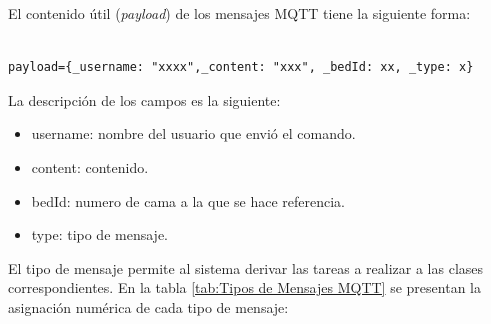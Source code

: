 El contenido útil (\textit{payload}) de los mensajes MQTT tiene la siguiente forma:

\begin{lstlisting}[label=cod:Mensaje MQTT,caption=  Formato mensaje MQTT]

payload={_username: "xxxx",_content: "xxx", _bedId: xx, _type: x}

\end{lstlisting}

La descripción de los campos es la siguiente:
\begin{itemize}
\item \textunderscore username: nombre del usuario que envió el comando.
\item \textunderscore content: contenido.
\item \textunderscore bedId: numero de cama a la que se hace referencia.
\item \textunderscore type: tipo de mensaje.
\end{itemize}

El tipo de mensaje permite al sistema derivar las tareas a realizar a las clases correspondientes. En la tabla \ref{tab:Tipos de Mensajes MQTT} se presentan la asignación numérica de cada tipo de mensaje:

